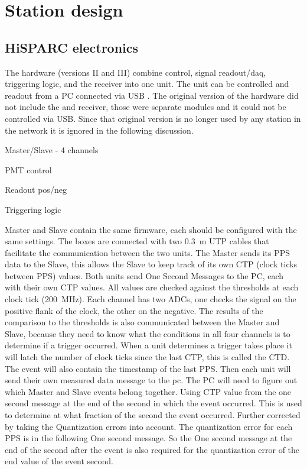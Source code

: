 \section{Station design}

\subsection{HiSPARC electronics}

The \hisparc hardware (versions II and III) combine \pmt control, signal
readout/daq, triggering logic, and the \gps receiver into one unit. The
unit can be controlled and readout from a PC connected via USB
\cite{messages}. The original version of the \hisparc hardware did not
include the \daq and \gps receiver, those were separate modules and it
could not be controlled via USB. Since that original version is no
longer used by any station in the network it is ignored in the following
discussion.

Master/Slave - 4 channels

PMT control

Readout pos/neg

Triggering logic

Master and Slave contain the same firmware, each should be configured
with the same settings. The boxes are connected with two
\SI{0.3}{\meter} UTP cables that facilitate the communication between
the two units. The Master sends its PPS data to the Slave, this allows
the Slave to keep track of its own CTP (clock ticks between PPS) values.
Both units send One Second Messages to the PC, each with their own CTP
values. All \adc values are checked against the thresholds at each clock
tick (\SI{200}{\mega\hertz}). Each channel has two ADCs, one checks the
signal on the positive flank of the clock, the other on the negative.
The results of the comparison to the thresholds is also communicated
between the Master and Slave, because they need to know what the
conditions in all four channels is to determine if a trigger occurred.
When a unit determines a trigger takes place it will latch the number of
clock ticks since the last CTP, this is called the CTD. The event will
also contain the timestamp of the last PPS. Then each unit will send
their own measured data message to the pc. The PC will need to figure
out which Master and Slave events belong together. Using CTP value from
the one second message at the end of the second in which the event
occurred. This is used to determine at what fraction of the second the
event occurred. Further corrected by taking the Quantization errors into
account. The quantization error for each PPS is in the following One
second message. So the One second message at the end of the second after
the event is also required for the quantization error of the end value
of the event second.


